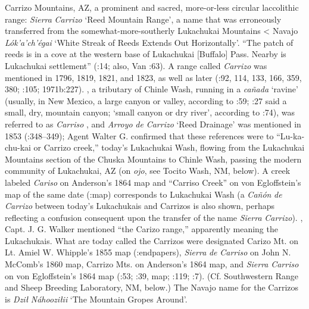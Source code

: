 Carrizo Mountains, AZ, a prominent and sacred, more-or-less circular laccolithic range:  \textit{Sierra} \textit{Carrizo} ‘Reed Mountain Range’, a name that was erroneously transferred from the somewhat-more-southerly Lukachukai Mountains < Navajo \textit{Lók’a’ch’égai} ‘White Streak of Reeds Extends Out Horizontally’.  “The patch of reeds is in a cove at the western base of Lukachukai [Buffalo] Pass.  Nearby is Lukachukai settlement” (\citealt{BarnesGranger1960}:14; also, Van \citealt{Valknburgh1999}:63).  A range called \textit{Carrizo} was mentioned in 1796, 1819, 1821, and 1823, as well as later (\citealt{Correll1979}:92, 114, 133, 166, 359, 380; \citealt{Reeve1971a}:105; 1971b:227).  \citealt{In1851}, a tributary of Chinle Wash, running in a \textit{cañada} ‘ravine’ (usually, in New Mexico, a large canyon or valley, according to \citealt{Julyan1998}:59; \citealt{Cobos1983}:27 said a small, dry, mountain canyon; ‘small canyon or dry river’, according to \citealt{Studerus2001}:74), was referred to as \textit{Carriso} \citep[285]{Correll1979}, and \textit{Arroyo} \textit{de} \textit{Carrizo} ‘Reed Drainage’ was mentioned in 1853 (\citealt{McNitt1972}:348–349); Agent Walter G. \citet[156]{Marmon1894} confirmed that these references were to “Lu-ka-chu-kai or Carrizo creek,” today’s Lukachukai Wash, flowing from the Lukachukai Mountains section of the Chuska Mountains to Chinle Wash, passing the modern community of Lukachukai, AZ (on \textit{ojo}, see Tocito Wash, NM, below).  A creek labeled \textit{Cariso} on Anderson’s 1864 map \citep{Kelly1970} and “Carriso Creek” on von Egloffstein’s map of the same date (\citealt{Madsen2010}:map) corresponds to Lukachukai Wash (a \textit{Cañón} \textit{de} \textit{Carrizo} between today’s Lukachukais and Carrizos is also shown, perhaps reflecting a confusion consequent upon the transfer of the name \textit{Sierra} \textit{Carrizo}).  \citealt{In1859}, Capt. J. G. Walker mentioned “the Carizo range,” apparently meaning the Lukachukais.  What are today called the Carrizos were designated Carizo Mt. on Lt. Amiel W. Whipple’s 1855 map (\citealt{Bailey1978}:endpapers), \textit{Sierra} \textit{de} \textit{Carriso} on John N. McComb’s 1860 map, Carrizo Mts. on Anderson’s 1864 map, and \textit{Sierra} \textit{Carriso} on von Egloffstein’s 1864 map (\citealt{Bailey1964a}:53; \citealt{Madsen2010}:39, map; \citealt{Eidenbach2012}:119; \citealt{BarnesGranger1960}:7).  (Cf. Southwestern Range and Sheep Breeding Laboratory, NM, below.)  The Navajo name for the Carrizos is \textit{Dził} \textit{Náhooziłii} ‘The Mountain Gropes Around’.

